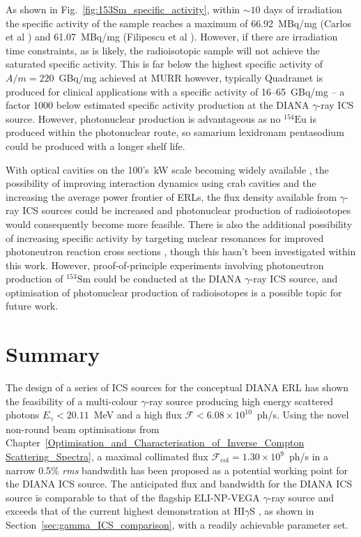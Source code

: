 \documentclass[../main.tex]{subfiles}
\begin{document}
As shown in Fig.~\ref{fig:153Sm_specific_activity}, within $\sim 10$ days of irradiation the specific activity of the sample reaches a maximum of 66.92~\si{\mega\becquerel}/\si{\milli\gram} (Carlos et al \cite{carlos1974giant}) and 61.07~\si{\mega\becquerel}/\si{\milli\gram} (Filipescu et al \cite{filipescu2014photoneutron}). However, if there are irradiation time constraints, as is likely, the radioisotopic sample will not achieve the saturated specific activity. This is far below the highest specific activity of $A/m=220$~\si{\giga\becquerel}/\si{\milli\gram} achieved at MURR \cite{ma1996production} however, typically Quadramet is produced for clinical applications with a specific activity of 16--65~\si{\giga\becquerel}/\si{\milli\gram} \cite{ema2015quadramet} -- a factor 1000 below estimated specific activity production at the DIANA $\gamma$-ray ICS source. However, photonuclear production is advantageous as no $^{154}\mathrm{Eu}$ is produced within the photonuclear route, so samarium lexidronam pentasodium could be produced with a longer shelf life.
 
With optical cavities on the 100's~\si{\kilo\watt} scale becoming widely available \cite{eggl2016munich,liu2018optical}, the possibility of improving interaction dynamics using crab cavities \cite{variola2011luminosity,koshiba2018luminosity} and the increasing the average power frontier of ERLs, the flux density available from $\gamma$-ray ICS sources could be increased and photonuclear production of radioisotopes would consequently become more feasible. There is also the additional possibility of increasing specific activity by targeting nuclear resonances for improved photoneutron reaction cross sections \cite{habs2011production}, though this hasn't been investigated within this work. However, proof-of-principle experiments involving photoneutron production of $^{153}\mathrm{Sm}$ could be conducted at the DIANA $\gamma$-ray ICS source, and optimisation of photonuclear production of radioisotopes is a possible topic for future work.      

\section{Summary}

The design of a series of ICS sources for the conceptual DIANA ERL has shown the feasibility of a multi-colour $\gamma$-ray source producing high energy scattered photons $E_{\gamma}<20.11$~\si{\mega\electronvolt} and a high flux $\mathcal{F}<6.08\times 10^{10}$~ph/\si{\second}. Using the novel non-round beam optimisations from Chapter~\ref{Optimisation_and_Characterisation_of_Inverse_Compton Scattering_Spectra}, a maximal collimated flux $\mathcal{F}_{\mathrm{col}}=1.30\times 10^{9}$~ph/\si{\second} in a narrow 0.5\% \textit{rms} bandwdith has been proposed as a potential working point for the DIANA ICS source. The anticipated flux and bandwidth for the DIANA ICS source is comparable to that of the flagship ELI-NP-VEGA \cite{elinp2019vega,tanaka2020current} $\gamma$-ray source and exceeds that of the current highest demonstration at HI$\gamma$S \cite{weller2009research}, as shown in Section~\ref{sec:gamma_ICS_comparison}, with a readily achievable parameter set.
\end{document}
